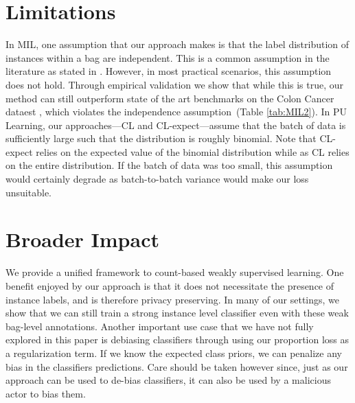 \documentclass{article}
\begin{document}
\section{Limitations} 
In MIL, one assumption that our approach makes is that the label distribution of instances within a bag are independent. This is a common assumption in the literature as stated in \citet{carbonneau2018multiple}. However, in most practical scenarios, this assumption does not hold. Through empirical validation we show that while this is true, our method can still outperform state of the art benchmarks on the Colon Cancer dataest \cite{2016colon}, which violates the independence assumption~(Table \ref{tab:MIL2}). 
In PU Learning, our approaches—CL and CL-expect—assume that the batch of data is sufficiently large such that the distribution is roughly binomial. Note that CL-expect relies on the expected value of the binomial distribution while as CL relies on the entire distribution. If the batch of data was too small, this assumption would certainly degrade as batch-to-batch variance would make our loss unsuitable.  

\section{Broader Impact}
We provide a unified framework to count-based weakly supervised learning.
One benefit enjoyed by our approach is that it does not necessitate the 
presence of instance labels, and is therefore privacy preserving.
In many of our settings, we show that we can still train a strong instance
level classifier even with these weak bag-level annotations.
Another important use case that we have not fully explored in this paper is 
debiasing classifiers through using our proportion loss as a regularization term.
If we know the expected class priors, we can penalize any bias in the classifiers predictions.
Care should be taken however since, just as our approach can be used to de-bias 
classifiers, it can also be used by a malicious actor to bias them.
\end{document}
